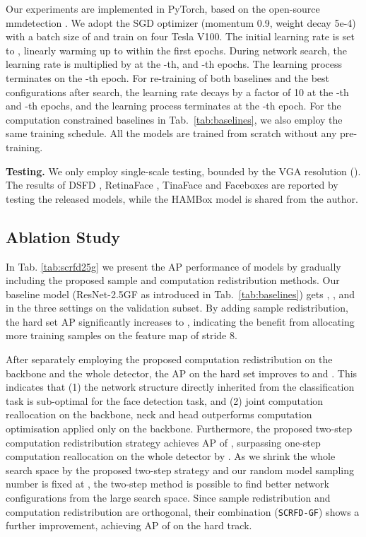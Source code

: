 \documentclass[10pt,twocolumn,letterpaper]{article}
\newcommand{\dsname}[1]{\texttt{\small #1}\xspace}
\newcommand{\scrfdf}[1]{\dsname{SCRFD-\text{#1}GF}}
\begin{document}
Our experiments are implemented in PyTorch, based on the open-source mmdetection \cite{chen2019mmdetection}. 
We adopt the SGD optimizer (momentum 0.9, weight decay 5e-4) with a batch size of  and train on four Tesla V100. 
The initial learning rate is set to , linearly warming up to  within the first  epochs. During network search, the learning rate is multiplied by  at the -th, and -th epochs. The learning process terminates on the -th epoch. For re-training of both baselines and the best configurations after search, the learning rate decays by a factor of 10 at the -th and -th epochs, and the learning process terminates at the -th epoch. For the computation constrained baselines in Tab.~\ref{tab:baselines}, we also employ the same training schedule. All the models are trained from scratch without any pre-training.

\noindent\textbf{Testing.}
We only employ single-scale testing, bounded by the VGA resolution (). 
The results of DSFD \cite{li2019dsfd}, RetinaFace \cite{deng2019retinaface}, TinaFace \cite{zhu2020tinaface} and Faceboxes \cite{zhang2017faceboxes} are reported by testing the released models, while the HAMBox \cite{liu2019hambox} model is shared from the author.

\subsection{Ablation Study}
In Tab. \ref{tab:scrfd25g} we present the AP performance of models by gradually including the proposed sample and computation redistribution methods. Our baseline model (\ie ResNet-2.5GF as introduced in Tab.~\ref{tab:baselines}) gets , , and  in the three settings on the validation subset. By adding sample redistribution, the hard set AP significantly increases to , indicating the benefit from allocating more training samples on the feature map of stride 8. 

After separately employing the proposed computation redistribution on the backbone and the whole detector, the AP on the hard set improves to  and . This indicates that (1) the network structure directly inherited from the classification task is sub-optimal for the face detection task, and (2) joint computation reallocation on the backbone, neck and head outperforms computation optimisation applied only on the backbone. Furthermore, the proposed two-step computation redistribution strategy achieves AP of , surpassing one-step computation reallocation on the whole detector by . As we shrink the whole search space by the proposed two-step strategy and our random model sampling number is fixed at , the two-step method is possible to find better network configurations from the large search space. Since sample redistribution and computation redistribution are orthogonal, their combination (\ie \scrfdf{2.5}) shows a further improvement, achieving AP of  on the hard track.
\end{document}
